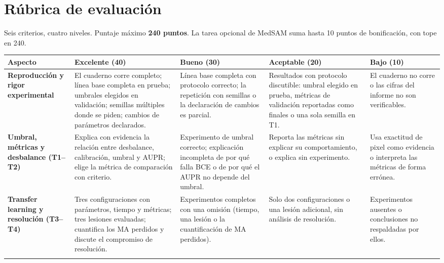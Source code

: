 \documentclass[11pt, a4paper]{article}
\begin{document}
\section{Rúbrica de evaluación}
\label{sec:rubrica}

\noindent
Seis criterios, cuatro niveles. Puntaje m\'aximo \textbf{240 puntos}. La tarea opcional de MedSAM suma hasta 10 puntos de bonificaci\'on, con tope en 240.

\vspace{0.6em}
\footnotesize
\noindent
\begin{tabularx}{\textwidth}{@{}>{\raggedright\arraybackslash}p{2.35cm} *{4}{>{\raggedright\arraybackslash}X}@{}}
\toprule
\textbf{Aspecto} & \textbf{Excelente (40)} & \textbf{Bueno (30)} & \textbf{Aceptable (20)} & \textbf{Bajo (10)}\\
\midrule

\textbf{Reproducción y rigor experimental}
& El cuaderno corre completo; l\'inea base completa en prueba; umbrales elegidos en validaci\'on; semillas m\'ultiples donde se piden; cambios de par\'ametros declarados.
& L\'inea base completa con protocolo correcto; la repetici\'on con semillas o la declaraci\'on de cambios es parcial.
& Resultados con protocolo discutible: umbral elegido en prueba, m\'etricas de validaci\'on reportadas como finales o una sola semilla en T1.
& El cuaderno no corre o las cifras del informe no son verificables.\\
\addlinespace[3pt]

\textbf{Umbral, métricas y desbalance (T1--T2)}
& Explica con evidencia la relaci\'on entre desbalance, calibraci\'on, umbral y AUPR; elige la m\'etrica de comparaci\'on con criterio.
& Experimento de umbral correcto; explicaci\'on incompleta de por qu\'e falla BCE o de por qu\'e el AUPR no depende del umbral.
& Reporta las m\'etricas sin explicar su comportamiento, o explica sin experimento.
& Usa exactitud de pixel como evidencia o interpreta las m\'etricas de forma err\'onea.\\
\addlinespace[3pt]

\textbf{Transfer learning y resolución (T3--T4)}
& Tres configuraciones con par\'ametros, tiempo y m\'etricas; tres lesiones evaluadas; cuantifica los MA perdidos y discute el compromiso de resoluci\'on.
& Experimentos completos con una omisi\'on (tiempo, una lesi\'on o la cuantificaci\'on de MA perdidos).
& Solo dos configuraciones o una lesi\'on adicional, sin an\'alisis de resoluci\'on.
& Experimentos ausentes o conclusiones no respaldadas por ellos.\\
\addlinespace[3pt]


\end{tabularx}
\end{document}
